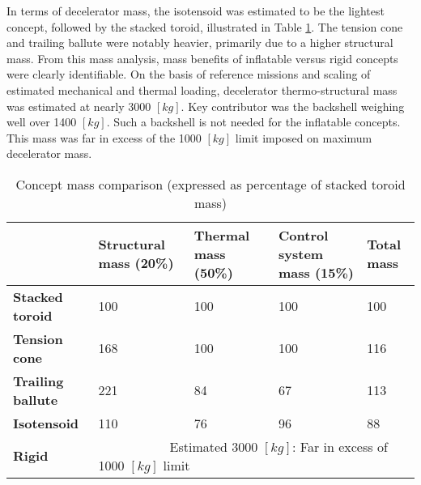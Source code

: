 In terms of decelerator mass, the isotensoid was estimated to be the lightest concept, followed by the stacked toroid, illustrated in Table \ref{tab:cmass}. The tension cone and trailing ballute were notably heavier, primarily due to a higher structural mass. From this mass analysis, mass benefits of inflatable versus rigid concepts were clearly identifiable. On the basis of reference missions and scaling of estimated mechanical and thermal loading, decelerator thermo-structural mass was estimated at nearly 3000 $[kg]$. Key contributor was the backshell weighing well over 1400 $[kg]$. Such a backshell is not needed for the inflatable concepts. This mass was far in excess of the 1000 $[kg]$ limit imposed on maximum decelerator mass.

\begin{table}[h]
\centering
\caption[Concept mass comparison]{Concept mass comparison (expressed as percentage of stacked toroid mass)}\label{tab:cmass}
\begin{tabular}{|p{}|p{}|p{}|p{}||p{}|}

\hline
                          & \textbf{Structural mass (20\%)} & \textbf{Thermal mass (50\%)} & \textbf{Control system mass (15\%)} & \textbf{Total mass} \\ \hline
\textbf{Stacked toroid}   &  100                                 & 100                          & 100                                      &\cellcolor{green!70}  100                           \\ \hline
\textbf{Tension cone}     &  168                               & 100                               &  100                                     &\cellcolor{yellow!70} 116                                 \\ \hline
\textbf{Trailing ballute} &  221                                 & 84                               & 67                                      &\cellcolor{yellow!70} 113 \\ \hline
\textbf{Isotensoid}       &  110                                 & 76                               & 96                                      &\cellcolor{green!70} 88 \\ \hline \hline
\textbf{Rigid}            &  \multicolumn{4}{p{0.736\textwidth}|}{\cellcolor{red!60} ~~~~~~~~~~~Estimated 3000 $[kg]$: Far in excess of 1000 $[kg]$ limit}    \\ \hline
\end{tabular}
\end{table}

